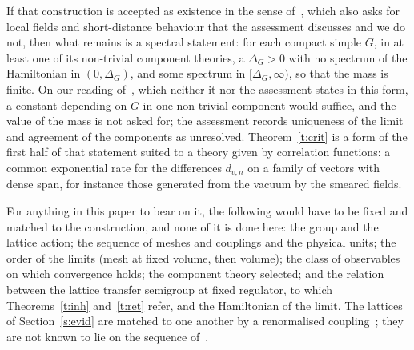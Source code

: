 If that construction is accepted as existence in the sense of~\cite{JW}, which also asks for local fields and
short-distance behaviour that the assessment discusses and we do not, then what remains is a spectral
statement: for each compact simple $G$, in at least one of its non-trivial component theories, a $\Delta_G>0$
with no spectrum of the Hamiltonian in $(0,\Delta_G)$, and some spectrum in $[\Delta_G,\infty)$, so that the mass is finite.
On our reading of~\cite{JW}, which neither it nor the assessment states in this form, a constant depending
on $G$ in one non-trivial component would suffice, and the value of the mass is not asked for; the
assessment records uniqueness of the limit and agreement of the components as unresolved. Theorem~\ref{t:crit} is a form of the first half of that statement suited to a
theory given by correlation functions: a common exponential rate for the differences $d_{v,n}$ on a family of
vectors with dense span, for instance those generated from the vacuum by the smeared fields.

For anything in this paper to bear on it, the following would have to be fixed and matched to the
construction, and none of it is done here: the group and the lattice action; the sequence of meshes and
couplings and the physical units; the order of the limits (mesh at fixed volume, then volume); the class of
observables on which convergence holds; the component theory selected; and the relation between the lattice
transfer semigroup at fixed regulator, to which Theorems~\ref{t:inh} and~\ref{t:ret} refer, and the
Hamiltonian of the limit. The lattices of Section~\ref{s:evid} are matched to one another by a renormalised
coupling~\cite{RepoData}; they are not known to lie on the sequence of~\cite{OAI}.


